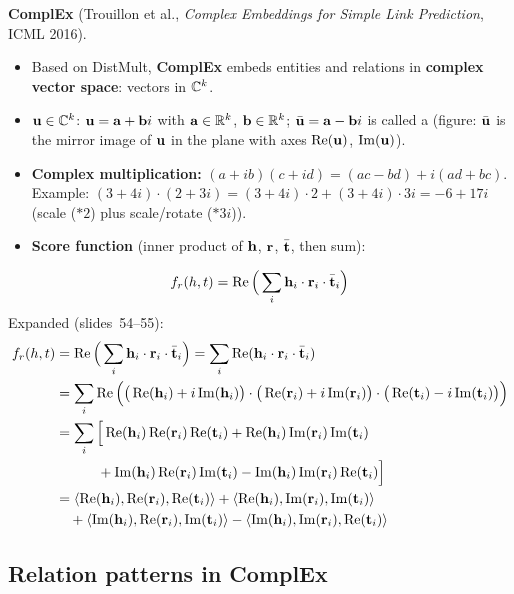 \textbf{ComplEx} (Trouillon et al., \emph{Complex Embeddings for Simple Link
Prediction}, ICML 2016).
\begin{itemize}
  \item Based on DistMult, \textbf{ComplEx} embeds entities and relations in
    \textbf{complex vector space}: vectors in $\C^k$.
  \item $\vu\in\C^k$: $\vu=\va+\vb i$ with $\va\in\R^k$, $\vb\in\R^k$;
    $\bar\vu=\va-\vb i$ is called a  (figure: $\bar\vu$ is the
    mirror image of $\vu$ in the plane with axes $\cRe(\vu)$, $\cIm(\vu)$).
  \item \textbf{Complex multiplication:} $(a+ib)(c+id)=(ac-bd)+i(ad+bc)$.
    Example: $(3+4i)\cdot(2+3i)=(3+4i)\cdot 2+(3+4i)\cdot 3i=-6+17i$ (scale
    ($\ast2$) plus scale/rotate ($\ast3i$)).
  \item \textbf{Score function} (inner product of $\vh$, $\vr$, $\bar\vt$, then
    sum):
\end{itemize}
\begin{equation}\label{eq:lec10-complex}
  f_r(h,t)=\cRe\Big(\sum_i\vh_i\cdot\vr_i\cdot\bar\vt_i\Big)
\end{equation}
Expanded (slides~54--55):
\begin{align}
  f_r(h,t)&=\cRe\Big(\sum_i\vh_i\cdot\vr_i\cdot\bar\vt_i\Big)
    =\sum_i\cRe(\vh_i\cdot\vr_i\cdot\bar\vt_i)\notag\\
  &=\sum_i\cRe\Big(\big(\cRe(\vh_i)+i\cIm(\vh_i)\big)\cdot
    \big(\cRe(\vr_i)+i\cIm(\vr_i)\big)\cdot\big(\cRe(\vt_i)-i\cIm(\vt_i)\big)\Big)\notag\\
  &=\sum_i\Big[\cRe(\vh_i)\cRe(\vr_i)\cRe(\vt_i)+\cRe(\vh_i)\cIm(\vr_i)\cIm(\vt_i)\notag\\
  &\qquad\quad +\cIm(\vh_i)\cRe(\vr_i)\cIm(\vt_i)-\cIm(\vh_i)\cIm(\vr_i)\cRe(\vt_i)\Big]\notag\\
  &=\langle\cRe(\vh_i),\cRe(\vr_i),\cRe(\vt_i)\rangle
    +\langle\cRe(\vh_i),\cIm(\vr_i),\cIm(\vt_i)\rangle\notag\\
  &\quad+\langle\cIm(\vh_i),\cRe(\vr_i),\cIm(\vt_i)\rangle
    -\langle\cIm(\vh_i),\cIm(\vr_i),\cRe(\vt_i)\rangle
  \label{eq:lec10-complex-expand}
\end{align}

\subsection{Relation patterns in ComplEx}\label{sec:lec10-complex-patterns}


